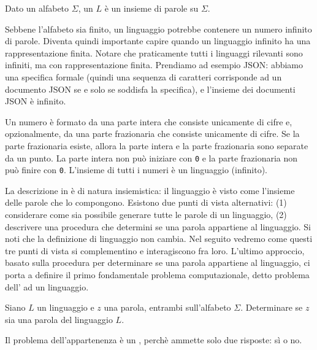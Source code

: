 \begin{definition}[Linguaggio]\label{def:linguaggio}
Dato un alfabeto $\Sigma$, un  $L$ è un insieme di parole su $\Sigma$.
\end{definition}

Sebbene l'alfabeto sia finito, un linguaggio potrebbe contenere un numero
infinito di parole.
Diventa quindi importante capire quando un linguaggio infinito ha una
rappresentazione finita.
Notare che praticamente tutti i linguaggi rilevanti sono infiniti, ma con
rappresentazione finita.
Prendiamo ad esempio JSON: abbiamo una specifica formale (quindi una sequenza di
caratteri corrisponde ad un documento JSON se e solo se soddisfa la specifica),
e l'insieme dei documenti JSON è infinito.

\begin{example}\label{exa:numeri}
Un numero è formato da una parte intera che consiste unicamente di cifre e,
opzionalmente, da una parte frazionaria che consiste unicamente di cifre.
Se la parte frazionaria esiste, allora la parte intera e la parte frazionaria
sono separate da un punto.
La parte intera non può iniziare con \texttt{0} e la parte frazionaria non può
finire con \texttt{0}.
L'insieme di tutti i numeri è un linguaggio (infinito).
\end{example}

La descrizione in  è di natura insiemistica:  il
linguaggio è visto come l'insieme delle parole che lo compongono.
Esistono due punti di vista alternativi: (1) considerare come sia possibile generare
tutte le parole di un linguaggio, (2) descrivere una procedura che determini se
una parola appartiene al linguaggio.
Si noti che la definizione di linguaggio non cambia.
Nel seguito vedremo come questi tre punti di vista si complementino e
interagiscono fra loro.
L'ultimo approccio, basato sulla procedura per determinare se una parola
appartiene al linguaggio, ci porta a definire il primo fondamentale problema
computazionale, detto problema dell' ad un linguaggio.


\begin{problem}[Appartenenza]\label{pb:appartenenza}
Siano $L$ un linguaggio e $z$ una parola, entrambi sull'alfabeto $\Sigma$.
Determinare se $z$ sia una parola del linguaggio $L$.
\end{problem}

Il problema dell'appartenenza è un , perchè
ammette solo due risposte: sì o no.


